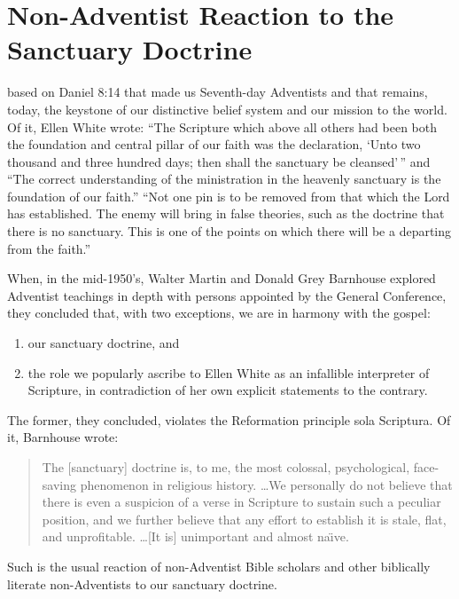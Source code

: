 \chapter{Non-Adventist Reaction to the Sanctuary Doctrine}
\label{ch:non-sda}

 based on Daniel 8:14 that made us Seventh-day
Adventists and that remains, today, the keystone of our distinctive belief
system and our mission to the world. Of it, Ellen White wrote: ``The
Scripture which above all others had been both the foundation and central 
pillar of our faith was the declaration, `Unto two thousand and three
hundred days; then shall the sanctuary be cleansed'\,'' and ``The correct
understanding of the ministration in the heavenly sanctuary is the
foundation of our faith.'' ``Not one pin is to be removed from that which the
Lord has established. The enemy will bring in false theories, such as the
doctrine that there is no sanctuary. This is one of the points on which
there will be a departing from the faith.''

When, in the mid-1950's, Walter Martin and Donald Grey Barnhouse explored
Adventist teachings in depth with persons appointed by the General
Conference, they concluded that, with two exceptions, we are in harmony with
the gospel:
\begin{enumerate}
    \item our sanctuary doctrine, and 
    \item the role we popularly
ascribe to Ellen White as an infallible interpreter of Scripture, in
contradiction of her own explicit statements to the contrary.
\end{enumerate}
The former,
they concluded, violates the Reformation principle sola
Scriptura. Of it, Barnhouse wrote: 
\begin{quote}
The [sanctuary] doctrine is, to me, the most colossal,
psychological, face-saving phenomenon in religious history. \ldots We
personally do not believe that there is even a suspicion of a verse in
Scripture to sustain such a peculiar position, and we further believe that
any effort to establish it is stale, flat, and unprofitable. \ldots [It is]
unimportant and almost na\"{\i}ve.\cite{33} 
\end{quote}

\newpage
Such is the usual reaction of non-Adventist Bible scholars and other
biblically literate non-Adventists to our sanctuary doctrine.
